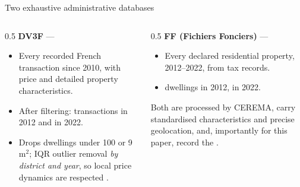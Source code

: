 \documentclass[aspectratio=169]{beamer}
\newcommand{\eur}{\texteuro{}}
\begin{document}
\begin{frame}{Two exhaustive administrative databases}
    \begin{columns}[T]
        \begin{column}{0.5\textwidth}
            \textbf{DV3F} --- 
            \begin{itemize}
                \item Every recorded French transaction since 2010, with price
                      and detailed property characteristics.
                \item After filtering:  transactions in 2012 and
                       in 2022.
                \item Drops dwellings under \eur 100 or 9\,m$^2$; IQR outlier
                      removal \emph{by district and year}, so local price
                      dynamics are respected \citep{Kiel2008_location_3L}.
            \end{itemize}
        \end{column}
        \begin{column}{0.5\textwidth}
            \textbf{FF (Fichiers Fonciers)} --- 
            \begin{itemize}
                \item Every declared residential property, 2012--2022, from tax
                      records.
                \item {} dwellings in 2012,
                       in 2022.
            \end{itemize}
            \vspace{0.5em}
            Both are processed by CEREMA, carry standardised characteristics and
            precise geolocation, and, importantly for this paper, record the
            .
        \end{column}
    \end{columns}

    \vspace{0.4em}
\end{frame}
\end{document}
